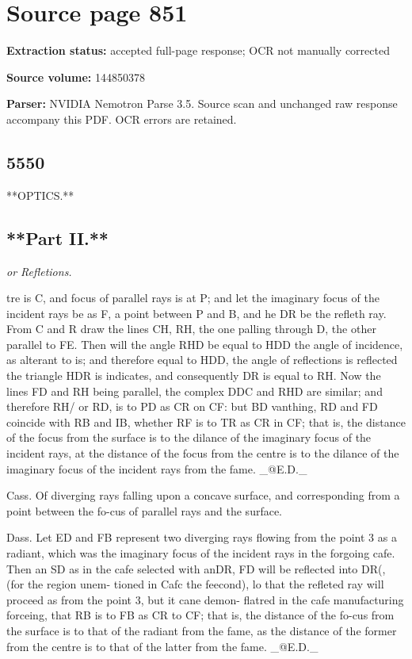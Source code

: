 \clearpage
\section{Source page 851}
\textbf{Extraction status:} accepted full-page response; OCR not manually corrected\par
\textbf{Source volume:} 144850378\par
\textbf{Parser:} NVIDIA Nemotron Parse 3.5. Source scan and unchanged raw response accompany this PDF. OCR errors are retained.\par\medskip
\subsection*{5550}
**OPTICS.**\par\medskip
\subsection*{**Part II.**}
{\small\itshape or Refletions.\par}\medskip
tre is C, and focus of parallel rays is at P; and let the imaginary focus of the incident rays be as F, a point between P and B, and he DR be the refleth ray. From C and R draw the lines CH, RH, the one palling through D, the other parallel to FE. Then will the angle RHD be equal to HDD the angle of incidence, as alterant to is; and therefore equal to HDD, the angle of reflections is reflected the triangle HDR is indicates, and consequently DR is equal to RH. Now the lines FD and RH being parallel, the complex DDC and RHD are similar; and therefore RH/ or RD, is to PD as CR on CF: but BD vanthing, RD and FD coincide with RB and IB, whether RF is to TR as CR in CF; that is, the distance of the focus from the surface is to the dilance of the imaginary focus of the incident rays, at the distance of the focus from the centre is to the dilance of the imaginary focus of the incident rays from the fame. \_@E.D.\_\par\medskip
Cass. Of diverging rays falling upon a concave surface, and corresponding from a point between the fo-cus of parallel rays and the surface.\par\medskip
Dass. Let ED and FB represent two diverging rays flowing from the point 3 as a radiant, which was the imaginary focus of the incident rays in the forgoing cafe. Then an SD as in the cafe selected with anDR, FD will be reflected into DR(, (for the region unem- tioned in Cafc the feecond), lo that the refleted ray will proceed as from the point 3, but it cane demon- flatred in the cafe manufacturing forceing, that RB is to FB as CR to CF; that is, the distance of the fo-cus from the surface is to that of the radiant from the fame, as the distance of the former from the centre is to that of the latter from the fame. \_@E.D.\_\par\medskip
